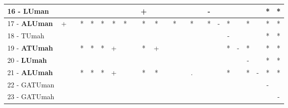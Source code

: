 \begin{table}[h]
\begin{center}
\begin{tabular}{lcc|cc|cc|cc|cc|cc|cc|cc|cc|cc|cc|c}
16 - \textbf{LUman}	&   &   &   &   &   &   &   &   & + &   &   &   &   &   &   & - &   &   &   &   &   & * & * \\ \hline
17 - \textbf{ALUman}	& + &   & * & * & * & * & * &   & * & * &   & * &   & * &   & * & - & * &   & * &   & * & * \\
18 - TUmah	&   &   &   &   &   &   &   &   &   &   &   &   &   &   &   &   &   & - &   &   &   & * & * \\ \hline
19 - \textbf{ATUmah}	&   &   & * & * & * & + &   &   & * & + &   &   &   &   &   &   &   & * & - & * &   & * & * \\
20 - \textbf{LUmah}	&   &   &   &   &   &   &   &   &   &   &   &   &   &   &   &   &   &   &   & - &   & * & * \\ \hline
21 - \textbf{ALUmah}	&   &   & * & * & * & + &   &   & * & * &   &   &   & . &   &   &   & * &   & * & - & * & * \\
22 - GATUman	&   &   &   &   &   &   &   &   &   &   &   &   &   &   &   &   &   &   &   &   &   & - &   \\ \hline
23 - GATUmah	&   &   &   &   &   &   &   &   &   &   &   &   &   &   &   &   &   &   &   &   &   &   & - \\\end{tabular}
\label{stratsALCKappaFriedVFDT}
\end{center}
\end{table}